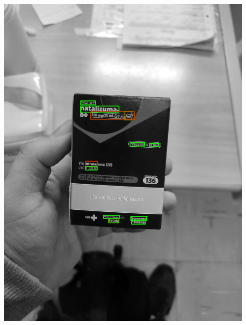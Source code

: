 \begin{frame}
\begin{columns}
\begin{column}{0.24\textwidth}
			\includegraphics[height=0.35\textheight]{../pictures/tysabri_rgb_r_only_boxes.jpg}
		\end{column}
		\begin{column}{0.24\textwidth}\centering

\end{column}
\end{columns}
\end{frame}
